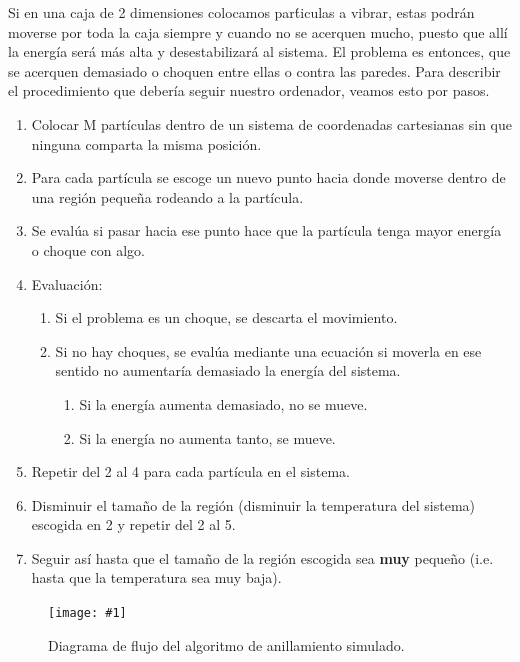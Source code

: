 \documentclass[10pt,letterpaper]{article}
\newcommand{\Picture}[3]
{
	\begin{figure}[H]
	\begin{center}
	\caption{#3}
	\texttt{[image: \#1]}
	\end{center}
	\end{figure}
}
\begin{document}
Si en una caja de 2 dimensiones colocamos par\'ticulas a vibrar, estas podr\'an moverse por toda la caja siempre y cuando no se acerquen mucho, puesto que all\'i la energ\'ia ser\'a m\'as alta y desestabilizar\'a al sistema. El problema es entonces, que se acerquen demasiado o choquen entre ellas o contra las paredes. Para describir el procedimiento que deber\'ia seguir nuestro ordenador, veamos esto por pasos.

\begin{enumerate}
\item Colocar M part\'iculas dentro de un sistema de coordenadas cartesianas sin que ninguna comparta la misma posici\'on.
\item Para cada part\'icula se escoge un nuevo punto hacia donde moverse dentro de una regi\'on peque\~na rodeando a la part\'icula.
\item Se eval\'ua si pasar hacia ese punto hace que la part\'icula tenga mayor energ\'ia o choque con algo.
\item Evaluaci\'on:
\begin{enumerate}
\item Si el problema es un choque, se descarta el movimiento.
\item Si no hay choques, se eval\'ua mediante una ecuaci\'on si moverla en ese sentido no aumentar\'ia demasiado la energ\'ia del sistema.
\begin{enumerate}
\item Si la energ\'ia aumenta demasiado, no se mueve.
\item Si la energ\'ia no aumenta tanto, se mueve.
\end{enumerate}
\end{enumerate}
\item Repetir del 2 al 4 para cada part\'icula en el sistema.
\item Disminuir el tama\~no de la regi\'on (disminuir la temperatura del sistema) escogida en 2 y repetir del 2 al 5.
\item Seguir as\'i hasta que el tama\~no de la regi\'on escogida sea \textbf{muy} peque\~no (i.e. hasta que la temperatura sea muy baja).
\end{enumerate}

\Picture{img/sim_ann.png}{0.6}{Diagrama de flujo del algoritmo de anillamiento simulado.}
\end{document}
